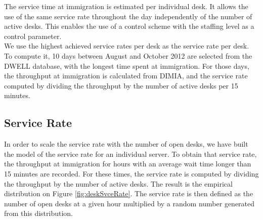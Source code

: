 \documentclass[11pt,onecolumn]{IEEEtran}
\begin{document}
The service time at immigration is estimated per individual desk. 
It allows the use of the same service rate throughout the day independently of the number of active desks.
This enables the use of a control scheme with the staffing level as a control parameter.\\

We use the highest achieved service rates per desk as the service rate per desk. To compute it, 10 days between August and October 2012 are selected from the DWELL database, with the longest time spent at immigration. For those days, the throughput at immigration is calculated from DIMIA, and the service rate computed by dividing the throughput by the number of active desks per 15 minutes. 


\subsection{Service Rate}
In order to scale the service rate with the number of open desks, we have built the model of the service rate for an individual server.
To obtain that service rate, the throughput at immigration for hours with an average wait time longer than 15 minutes are recorded. For these times,  the service rate is computed by dividing the throughput by the number of active desks. 
The result is the empirical distribution on Figure \ref{fig:deskSvceRate}.
The service rate  is then defined as the number of open desks at a given hour multiplied by a random number generated from this distribution.
\end{document}
